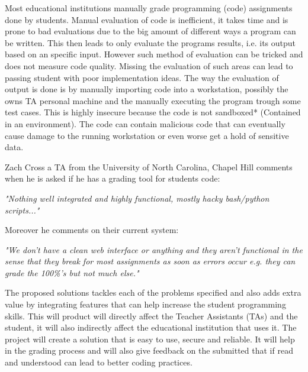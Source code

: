 Most educational institutions
manually grade programming (code) assignments done by students. Manual
evaluation of code is inefficient, it takes time and is prone to bad
evaluations due to the big amount of different ways a program can be written.
This then leads to only evaluate the programs results, i.e. its output based on
an specific input. However such method of evaluation can be tricked and does
not measure code quality. Missing the evaluation of such areas can lead to
passing student with poor implementation ideas. The way the evaluation of
output is done is by manually importing code into a workstation, possibly the
owns TA personal machine and the manually executing the program trough some
test cases. This is highly insecure because the code is not sandboxed*
(Contained in an environment). The code can contain malicious code that can
eventually cause damage to the running workstation or even worse get a hold of
sensitive data.

Zach Cross a TA from the University of North Carolina, Chapel Hill comments when he is asked if he has a grading tool for students code:

\textit{"Nothing well integrated and highly functional, mostly hacky bash/python scripts..."}

Moreover he comments on their current system:

\textit{"We don't have a clean web interface or anything and they aren't functional in the sense that they break for most assignments as soon as errors occur e.g. they can grade the 100\%'s but not much else."}

The proposed solutions tackles each of the problems specified and also adds
extra value by integrating features that can help increase the student
programming skills. This will product will directly affect the Teacher
Assistants (TAs) and the student, it will also indirectly affect the
educational institution that uses it. The project will create a solution that
is easy to use, secure and reliable. It will help in the grading process and
will also give feedback on the submitted that if read and understood can lead
to better coding practices.
